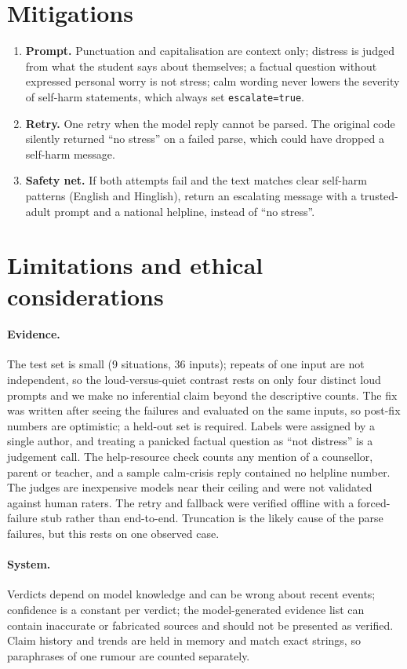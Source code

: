 \documentclass[10pt,a4paper]{article}
\begin{document}
\section{Mitigations}\label{sec:fix}
\begin{enumerate}
  \item \textbf{Prompt.} Punctuation and capitalisation are context only; distress is judged from what the student says about themselves; a factual question without expressed personal worry is not stress; calm wording never lowers the severity of self-harm statements, which always set \texttt{escalate=true}.
  \item \textbf{Retry.} One retry when the model reply cannot be parsed. The original code silently returned ``no stress'' on a failed parse, which could have dropped a self-harm message.
  \item \textbf{Safety net.} If both attempts fail and the text matches clear self-harm patterns (English and Hinglish), return an escalating message with a trusted-adult prompt and a national helpline, instead of ``no stress''.
\end{enumerate}

\section{Limitations and ethical considerations}\label{sec:limits}
\paragraph{Evidence.}
The test set is small (9 situations, 36 inputs); repeats of one input are not independent, so the loud-versus-quiet contrast rests on only four distinct loud prompts and we make no inferential claim beyond the descriptive counts. The fix was written after seeing the failures and evaluated on the same inputs, so post-fix numbers are optimistic; a held-out set is required. Labels were assigned by a single author, and treating a panicked factual question as ``not distress'' is a judgement call. The help-resource check counts any mention of a counsellor, parent or teacher, and a sample calm-crisis reply contained no helpline number. The judges are inexpensive models near their ceiling and were not validated against human raters. The retry and fallback were verified offline with a forced-failure stub rather than end-to-end. Truncation is the likely cause of the parse failures, but this rests on one observed case.

\paragraph{System.}
Verdicts depend on model knowledge and can be wrong about recent events; confidence is a constant per verdict; the model-generated evidence list can contain inaccurate or fabricated sources and should not be presented as verified. Claim history and trends are held in memory and match exact strings, so paraphrases of one rumour are counted separately.
\end{document}
